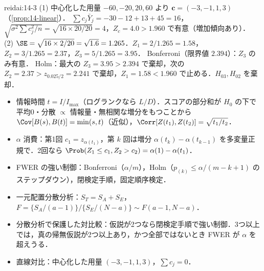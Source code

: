 \begin{kaitou}{reidai:14-3}
(1) 中心化した用量 $-60,-20,20,60$ より $\bm c=(-3,-1,1,3)$（\cref{prop:14-linear}）．
$\sum c_j\bar Y_j=-30-12+13+45=16$，$\sqrt{\sigma^2\sum c_j^2/n}=\sqrt{16\times20/20}=4$，$Z_c=4.0>1.960$ で有意（増加傾向あり）．\\
(2) $\SE=\sqrt{16\times2/20}=\sqrt{1.6}=1.265$．$Z_1=2/1.265=1.58$，$Z_2=3/1.265=2.37$，$Z_3=5/1.265=3.95$．
Bonferroni（限界値 $2.394$）：$Z_3$ のみ有意．
Holm：最大の $Z_3=3.95>2.394$ で棄却，次の $Z_2=2.37>z_{0.025/2}=2.241$ で棄却，$Z_1=1.58<1.960$ で止める．$H_{03},H_{02}$ を棄却．
\end{kaitou}

\begin{summarybox}
\begin{itemize}
\item 情報時間 $t=I/I_{\max}$（ログランクなら $L/D$）．スコアの部分和が $H_0$ の下で平均0・分散 $\propto$ 情報量・無相関な増分をもつことから $\Cov[B(s),B(t)]=\min(s,t)$（近似），$\Corr[Z(t_1),Z(t_2)]=\sqrt{t_1/t_2}$．
\item $\alpha$ 消費：第1回 $c_1=z_{\alpha(t_1)}$，第 $k$ 回は増分 $\alpha(t_k)-\alpha(t_{k-1})$ を多変量正規で．2回なら $\Prob(Z_1\le c_1,Z_2>c_2)=\alpha(1)-\alpha(t_1)$．
\item FWER の強い制御：Bonferroni（$\alpha/m$），Holm（$p_{(k)}\le\alpha/(m-k+1)$ のステップダウン），閉検定手順，固定順序検定．
\item 一元配置分散分析：$S_T=S_A+S_E$，$F=\{S_A/(a-1)\}/\{S_E/(N-a)\}\sim F(a-1,N-a)$．
\item 分散分析で保護した対比較：仮説が2つなら閉検定手順で強い制御．3つ以上では，真の帰無仮説が2つ以上あり，かつ全部ではないとき FWER が $\alpha$ を超えうる．
\item 直線対比：中心化した用量 $(-3,-1,1,3)$，$\sum c_j=0$．
\end{itemize}
\end{summarybox}
